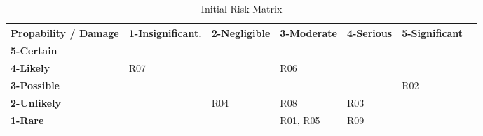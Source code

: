 \begin{table}[H]
  \centering
  \scriptsize
  \caption{Initial Risk Matrix}
  \begin{tabular}{|m{27mm}|m{24mm}|m{20mm}|m{20mm}|m{20mm}|m{20mm}|@{}m{0pt}@{}}
    \hline 	\bf Propability / Damage & \bf 1-Insignificant. 	& \bf 2-Negligible 				& \bf 3-Moderate 			& \bf 4-Serious 			& \bf 5-Significant 	& \\ [10pt]
    \hline 	\bf 5-Certain 			& \cellcolor{yellow!50} 	& \cellcolor{yellow!50} 	& \cellcolor{orange!50} 			& \cellcolor{red!50} 		& \cellcolor{red!50} 			& \\ [10pt]
			\bf 4-Likely 			& \cellcolor{green!50} R07 	& \cellcolor{yellow!50} 	& \cellcolor{yellow!50} R06 	& \cellcolor{orange!50} 		& \cellcolor{red!50} 			& \\ [10pt]
			\bf 3-Possible 				& \cellcolor{green!50} 		& \cellcolor{green!50} 		& \cellcolor{yellow!50} 		& \cellcolor{yellow!50} 	& \cellcolor{orange!50} R02 		& \\ [10pt]
			\bf 2-Unlikely 			& \cellcolor{green!50} 	& \cellcolor{green!50} R04 	& \cellcolor{green!50} R08 		& \cellcolor{yellow!50} R03 & \cellcolor{yellow!50} 		& \\ [10pt]
			\bf 1-Rare 			& \cellcolor{green!50} 		& \cellcolor{green!50} 		& \cellcolor{green!50} R01, R05 & \cellcolor{green!50} R09 	& \cellcolor{green!50} 		& \\ [10pt]
    \hline
  \end{tabular} \\
\end{table}

